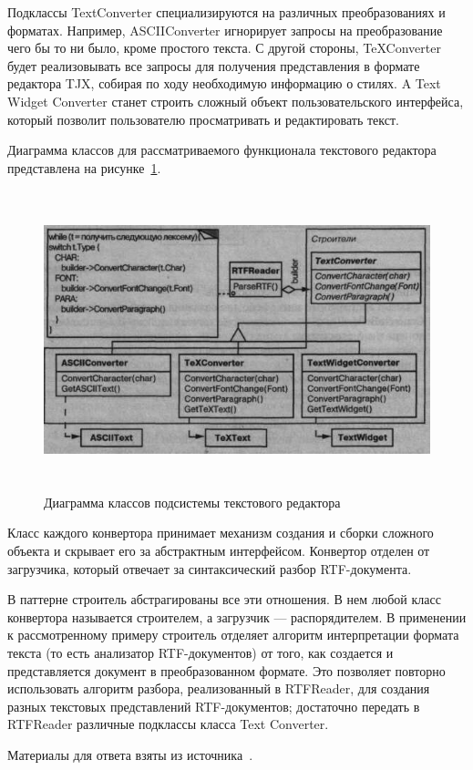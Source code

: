 Подклассы TextConverter специализируются на различных преобразованиях
и форматах. Например, ASCIIConverter игнорирует запросы на преобразование
чего бы то ни было, кроме простого текста. С другой стороны, TeXConverter будет
реализовывать все запросы для получения представления в формате редактора TJX,
собирая по ходу необходимую информацию о стилях. A Text Widget Converter
станет строить сложный объект пользовательского интерфейса, который позволит
пользователю просматривать и редактировать текст.

Диаграмма классов для рассматриваемого функционала текстового
редактора представлена на рисунке~\ref{fig:rtf_uml}.

\begin{figure}[h!]
  \centering
  \includegraphics[height=87mm]{pic/rtf_uml.png}
  \caption{Диаграмма классов подсистемы текстового редактора}
  \label{fig:rtf_uml}
\end{figure}

Класс каждого конвертора принимает механизм создания и сборки сложного
объекта и скрывает его за абстрактным интерфейсом. Конвертор отделен от 
загрузчика, который отвечает за синтаксический разбор RTF-документа.

В паттерне строитель абстрагированы все эти отношения. В нем любой класс
конвертора называется строителем, а загрузчик --- распорядителем.
В применении к рассмотренному примеру строитель отделяет алгоритм интерпретации
формата текста (то есть анализатор RTF-документов) от того, как создается и
представляется документ в преобразованном формате. Это позволяет повторно использовать
алгоритм разбора, реализованный в RTFReader, для создания разных текстовых
представлений RTF-документов; достаточно передать в RTFReader различные подклассы 
класса Text Converter.

Материалы для ответа взяты из источника~\cite{gamma01}.